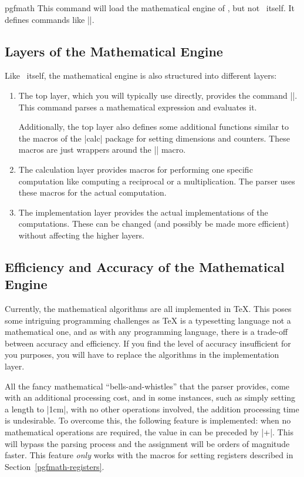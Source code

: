 \begin{package}{pgfmath}
  This command will load the mathematical engine of \pgfname, but not
  \pgfname\ itself. It defines commands like |\pgfmathparse|.
\end{package}


\subsection{Layers of the Mathematical Engine}

Like \pgfname\ itself, the mathematical engine is also structured into
different layers:

\begin{enumerate}
\item The top layer, which you will typically use directly, provides
  the command |\pgfmathparse|. This command parses a mathematical
  expression and evaluates it.

  Additionally, the top layer also defines some additional functions
  similar to the macros of the |calc| package for setting dimensions
  and counters. These macros are just wrappers around the
  |\pgfmathparse| macro.
\item The calculation layer provides macros for performing one
  specific computation like computing a reciprocal or a
  multiplication. The parser uses these macros for the actual
  computation.
\item The implementation layer provides the actual implementations of
  the computations. These can be changed (and possibly be made more
  efficient) without affecting the higher layers.
\end{enumerate}



\subsection{Efficiency and Accuracy of the Mathematical Engine}

Currently, the mathematical algorithms are all implemented in \TeX.
This poses some intriguing programming challenges as \TeX{} is a
typesetting language not a mathematical one, and as with any 
programming language, there is a trade-off between accuracy and 
efficiency. If you find the level of accuracy insufficient for you
purposes, you will have to replace the algorithms in the
implementation layer.

All the fancy mathematical ``bells-and-whistles'' that the parser 
provides, come with an additional processing cost, and in some
instances, such as simply setting a length to |1cm|, with no other
operations involved, the addition processing time is undesirable. 
To overcome this, the following feature is implemented: when no
mathematical operations are required, the value in 
can be preceded by |+|. This will bypass the parsing process and the 
assignment will be orders of magnitude faster. This feature 
\emph{only} works with the macros for setting registers described in
Section~\ref{pgfmath-registers}.

\begin{codeexample}
\pgfmathsetlength\mydimen{1cm}  %
\pgfmathsetlength\mydimen{+1cm} %
\end{codeexample}

